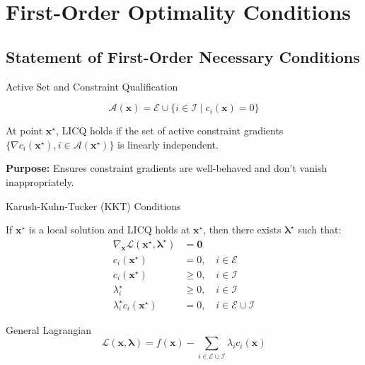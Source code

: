 \documentclass[aspectratio=1610]{beamer}
\begin{document}
\section{First-Order Optimality Conditions}
\subsection{Statement of First-Order Necessary Conditions}
\begin{frame}{Active Set and Constraint Qualification}
  \begin{definition}
    $$\mathcal{A}(\mathbf{x}) = \mathcal{E} \cup \{i \in \mathcal{I} \mid c_i(\mathbf{x}) = 0\}$$
  \end{definition}
  
  \begin{definition}
    At point $\mathbf{x}^{\star}$, LICQ holds if the set of active constraint gradients $\{\nabla c_i(\mathbf{x}^{\star}), i \in \mathcal{A}(\mathbf{x}^{\star})\}$ is linearly independent.
  \end{definition}
  
  \vspace{0.5cm}
  \textbf{Purpose:} Ensures constraint gradients are well-behaved and don't vanish inappropriately.
\end{frame}

\begin{frame}{Karush-Kuhn-Tucker (KKT) Conditions}
  \begin{theorem}
    If $\mathbf{x}^{\star}$ is a local solution and LICQ holds at $\mathbf{x}^{\star}$, then there exists $\boldsymbol{\lambda}^{\star}$ such that:
    \begin{align}
      \nabla_{\mathbf{x}} \mathcal{L}(\mathbf{x}^{\star}, \boldsymbol{\lambda}^{\star}) &= \mathbf{0} \tag{Stationarity}\\
      c_i(\mathbf{x}^{\star}) &= 0, \quad i \in \mathcal{E} \tag{Equality feasibility}\\
      c_i(\mathbf{x}^{\star}) &\geq 0, \quad i \in \mathcal{I} \tag{Inequality feasibility}\\
      \lambda_i^{\star} &\geq 0, \quad i \in \mathcal{I} \tag{Dual feasibility}\\
      \lambda_i^{\star} c_i(\mathbf{x}^{\star}) &= 0, \quad i \in \mathcal{E} \cup \mathcal{I} \tag{Complementarity}
    \end{align}
  \end{theorem}
  
  \begin{block}{General Lagrangian}
    $$\mathcal{L}(\mathbf{x}, \boldsymbol{\lambda}) = f(\mathbf{x}) - \sum_{i \in \mathcal{E} \cup \mathcal{I}} \lambda_i c_i(\mathbf{x})$$
  \end{block}
\end{frame}
\end{document}
